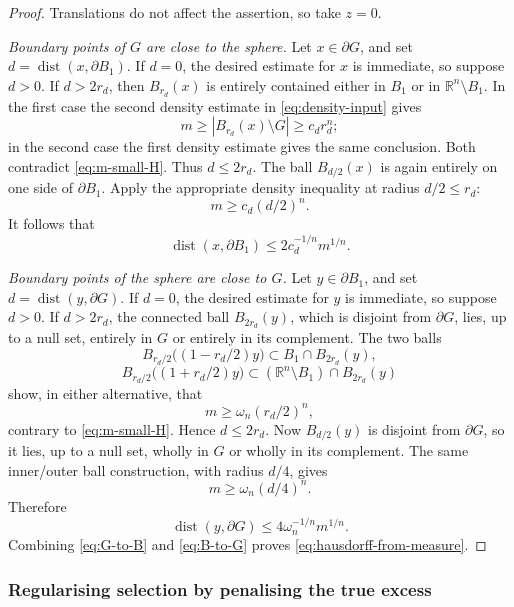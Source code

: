 \documentclass[11pt]{amsart}
\theoremstyle{definition}
\newcommand{\R}{\mathbb R}
\begin{document}
\begin{proof}
Translations do not affect the assertion, so take \(z=0\).

\emph{Boundary points of \(G\) are close to the sphere.}
Let \(x\in\partial G\), and set \(d=\operatorname{dist}(x,\partial B_1)\).
If \(d=0\), the desired estimate for \(x\) is immediate, so suppose
\(d>0\).
If \(d>2r_d\), then \(B_{r_d}(x)\) is entirely contained either in \(B_1\)
or in \(\R^n\setminus B_1\).  In the first case the second density estimate
in \eqref{eq:density-input} gives
\[
   m\ge|B_{r_d}(x)\setminus G|\ge c_dr_d^n;
\]
in the second case the first density estimate gives the same conclusion.
Both contradict \eqref{eq:m-small-H}.  Thus \(d\le2r_d\).
The ball \(B_{d/2}(x)\) is again entirely on one side of \(\partial B_1\).
Apply the appropriate density inequality at radius \(d/2\le r_d\):
\[
   m\ge c_d(d/2)^n.
\]
It follows that
\[
   \operatorname{dist}(x,\partial B_1)
   \le2c_d^{-1/n}m^{1/n}.
\tag{4.35}\label{eq:G-to-B}
\]

\emph{Boundary points of the sphere are close to \(G\).}
Let \(y\in\partial B_1\), and set
\(d=\operatorname{dist}(y,\partial G)\).
If \(d=0\), the desired estimate for \(y\) is immediate, so suppose
\(d>0\).
If \(d>2r_d\), the connected ball \(B_{2r_d}(y)\), which is disjoint from
\(\partial G\), lies, up to a null set, entirely in \(G\) or entirely in
its complement.
The two balls
\[
   B_{r_d/2}\bigl((1-r_d/2)y\bigr)\subset B_1\cap B_{2r_d}(y),
\]
\[
   B_{r_d/2}\bigl((1+r_d/2)y\bigr)
   \subset(\R^n\setminus B_1)\cap B_{2r_d}(y)
\]
show, in either alternative, that
\[
   m\ge\omega_n(r_d/2)^n,
\]
contrary to \eqref{eq:m-small-H}.  Hence \(d\le2r_d\).
Now \(B_{d/2}(y)\) is disjoint from \(\partial G\), so it lies, up to a
null set, wholly in \(G\) or wholly in its complement.  The same inner/outer ball construction,
with radius \(d/4\), gives
\[
   m\ge\omega_n(d/4)^n.
\]
Therefore
\[
   \operatorname{dist}(y,\partial G)
   \le4\omega_n^{-1/n}m^{1/n}.
\tag{4.36}\label{eq:B-to-G}
\]
Combining \eqref{eq:G-to-B} and \eqref{eq:B-to-G} proves
\eqref{eq:hausdorff-from-measure}.
\end{proof}


\subsubsection{Regularising selection by penalising the true excess}
\label{ssec:true-beta-selection}
\end{document}
